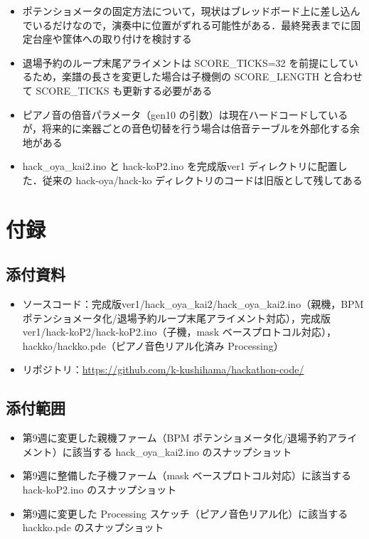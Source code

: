 \documentclass[a4paper,11pt]{ltjsarticle}
\providecommand{\％}{\%}
\begin{document}
\begin{itemize}
    \item ポテンショメータの固定方法について，現状はブレッドボード上に差し込んでいるだけなので，演奏中に位置がずれる可能性がある．最終発表までに固定台座や筐体への取り付けを検討する
    \item 退場予約のループ末尾アライメントは SCORE\_TICKS=32 を前提にしているため，楽譜の長さを変更した場合は子機側の SCORE\_LENGTH と合わせて SCORE\_TICKS も更新する必要がある
    \item ピアノ音の倍音パラメータ（gen10 の引数）は現在ハードコードしているが，将来的に楽器ごとの音色切替を行う場合は倍音テーブルを外部化する余地がある
    \item hack\_oya\_kai2.ino と hack-koP2.ino を完成版ver1 ディレクトリに配置した．従来の hack-oya/hack-ko ディレクトリのコードは旧版として残してある
\end{itemize}

\section{付録}\label{sec:appendix}

\subsection{添付資料}\label{sec:attach}

\begin{itemize}
    \item ソースコード：完成版ver1/hack\_oya\_kai2/hack\_oya\_kai2.ino（親機，BPM ポテンショメータ化/退場予約ループ末尾アライメント対応），完成版ver1/hack-koP2/hack-koP2.ino（子機，mask ベースプロトコル対応），hackko/hackko.pde（ピアノ音色リアル化済み Processing）
    \item リポジトリ：\url{https://github.com/k-kushihama/hackathon-code/}
\end{itemize}

\subsection{添付範囲}\label{sec:attach-scope}

\begin{itemize}
    \item 第9週に変更した親機ファーム（BPM ポテンショメータ化/退場予約アライメント）に該当する hack\_oya\_kai2.ino のスナップショット
    \item 第9週に整備した子機ファーム（mask ベースプロトコル対応）に該当する hack-koP2.ino のスナップショット
    \item 第9週に変更した Processing スケッチ（ピアノ音色リアル化）に該当する hackko.pde のスナップショット
\end{itemize}
\end{document}
